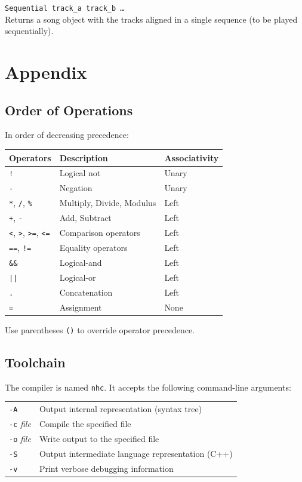 \documentclass[11pt, onecolumn, letterpaper]{article}
\begin{document}
\texttt{Sequential track\_a track\_b \ldots} \\ Returns a song object with the tracks aligned in a single sequence (to be played sequentially).

\section{Appendix}

\subsection{Order of Operations}

In order of decreasing precedence:

\begin{tabular} {l l l}
Operators & Description & Associativity \\
\hline
\texttt{!} & Logical not & Unary \\
\texttt{-} & Negation & Unary \\
\texttt{*}, \texttt{/}, \texttt{\%} & Multiply, Divide, Modulus & Left \\
\texttt{+}, \texttt{-} & Add, Subtract & Left \\
\texttt{<}, \texttt{>}, \texttt{>=}, \texttt{<=} & Comparison operators & Left \\
\texttt{==}, \texttt{!=} & Equality operators & Left \\
\texttt{\&\&} & Logical-and & Left \\
\texttt{||} & Logical-or & Left \\
\texttt{.} & Concatenation & Left \\
\texttt{=} & Assignment & None \\
\end{tabular}

Use parentheses \texttt{()} to override operator precedence.

\subsection{Toolchain}
The compiler is named \texttt{nhc}. It accepts the following command-line arguments:

\begin{tabular}{l l}
\texttt{-A} & Output internal representation (syntax tree) \\
\texttt{-c} \textit{file} & Compile the specified file \\
\texttt{-o} \textit{file} & Write output to the specified file \\
\texttt{-S} & Output intermediate language representation (C++) \\
\texttt{-v} & Print verbose debugging information \\
\end{tabular}
\end{document}
